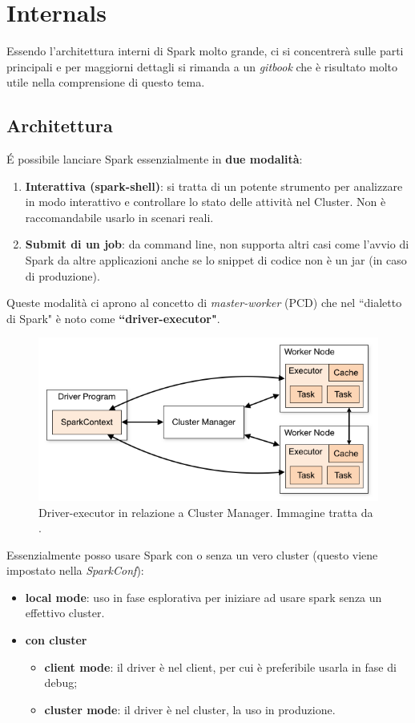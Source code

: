 \documentclass[12pt,italian]{article}
\begin{document}
\section{Internals}
Essendo l'architettura interni di Spark molto grande, ci si concentrerà sulle parti principali e per maggiorni dettagli si rimanda a un \textit{gitbook} \cite{internals} che è risultato molto utile nella comprensione di questo tema.
\subsection{Architettura}
É possibile lanciare Spark essenzialmente in \textbf{due modalità}:
\begin{enumerate}
	\item \textbf{Interattiva (spark-shell)}: si tratta di un potente strumento per analizzare in modo interattivo e controllare lo stato delle attività nel Cluster. Non è raccomandabile usarlo in scenari reali.
	\item \textbf{Submit di un job}: da command line, non supporta altri casi come l'avvio di Spark da altre applicazioni anche se lo snippet di codice non è un jar (in caso di produzione).
\end{enumerate}
Queste modalità ci aprono al concetto di \textit{master-worker} (PCD) che nel ``dialetto di Spark" è noto come \textbf{``driver-executor"}.
\begin{figure}[H]
	\centering 
	\includegraphics[width=1\linewidth]{img/cluster-overview.png}
	\caption{Driver-executor in relazione a Cluster Manager. Immagine tratta da \cite{spark}.}
	\label{fig:driverexecutor}
\end{figure}
Essenzialmente posso usare Spark con o senza un vero cluster (questo viene impostato nella \textit{SparkConf}):
\begin{itemize}
	\item \textbf{local mode}: uso in fase esplorativa per iniziare ad usare spark senza un effettivo cluster.
	\item \textbf{con cluster}
	\begin{itemize}
		\item \textbf{client mode}: il driver è nel client, per cui è preferibile usarla in fase di debug;
		\item \textbf{cluster mode}: il driver è nel cluster, la uso in produzione.
	\end{itemize}
\end{itemize}
\end{document}
